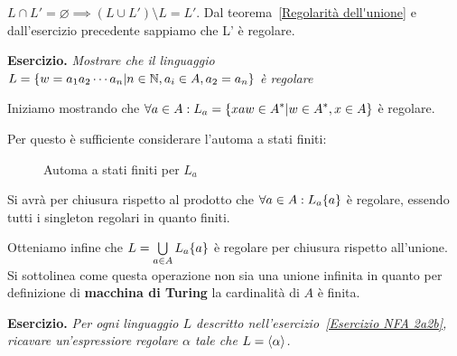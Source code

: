\(L\cap L' = \varnothing \implies (L \cup L') \setminus L = L'\). Dal teorema~\ref{Regolarità dell'unione} e dall'esercizio precedente sappiamo che L' è regolare.

\textbf{Esercizio. } \textit{Mostrare che il linguaggio \(L=\displaystyle{\left\{{w=a_1a_2\cdots a_n \vert n \in \mathbb{N}, a_i \in A, a_2=a_n}\right\}}\) è regolare}

Iniziamo mostrando che \(\forall a \in A: L_a=\displaystyle{\left\{{xaw \in A^* \vert w \in A^*, x \in A}\right\}}\) è regolare.

Per questo è sufficiente considerare l'automa a stati finiti:

\begin{figure}[ht]
    \centering
        \caption{Automa a stati finiti per \(L_a\)}\label{Automa L_a}
\end{figure}

Si avrà per chiusura rispetto al prodotto che \(\forall a \in A: L_a\displaystyle{\left\{{a}\right\}}\) è regolare, essendo tutti i singleton regolari in quanto finiti.

Otteniamo infine che \(L= \bigcup\limits_{a \in A} L_a\displaystyle{\left\{{a}\right\}}\) è regolare per chiusura rispetto all'unione. Si sottolinea come questa operazione non sia una unione infinita in quanto per definizione di \textbf{macchina di Turing} la cardinalità di \(A\) è finita.

\textbf{Esercizio. } \textit{Per ogni linguaggio \(L\) descritto nell'esercizio~\ref{Esercizio NFA 2a2b}, ricavare un'espressiore regolare \(\alpha\) tale che \(L = \displaystyle{\left\langle{\alpha}\right\rangle}\).} %


